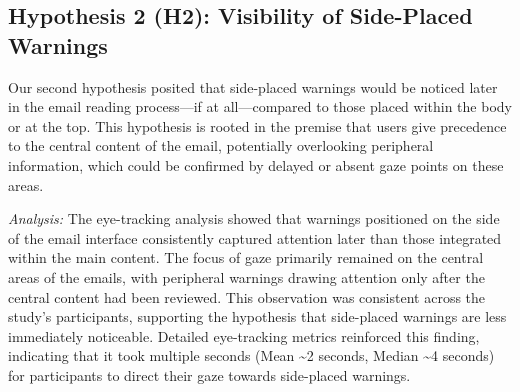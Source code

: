 \documentclass[
  a4paper,  %
  twoside,  %
  bibliography=totoc,
  headsepline,
  cleardoublepage=empty,
  parskip=half,
  draft=false
]{scrbook}
\begin{document}
\subsection{Hypothesis 2 (H2): Visibility of Side-Placed Warnings} 
Our second hypothesis posited that side-placed warnings would be noticed later in the email reading process—if at all—compared to those placed within the body or at the top. This hypothesis is rooted in the premise that users give precedence to the central content of the email, potentially overlooking peripheral information, which could be confirmed by delayed or absent gaze points on these areas. \par
\textit{Analysis:} The eye-tracking analysis showed that warnings positioned on the side of the email interface consistently captured attention later than those integrated within the main content. The focus of gaze primarily remained on the central areas of the emails, with peripheral warnings drawing attention only after the central content had been reviewed. This observation was consistent across the study's participants, supporting the hypothesis that side-placed warnings are less immediately noticeable. Detailed eye-tracking metrics reinforced this finding, indicating that it took multiple seconds (Mean \textasciitilde2 seconds, Median \textasciitilde4 seconds) for participants to direct their gaze towards side-placed warnings.
\end{document}
